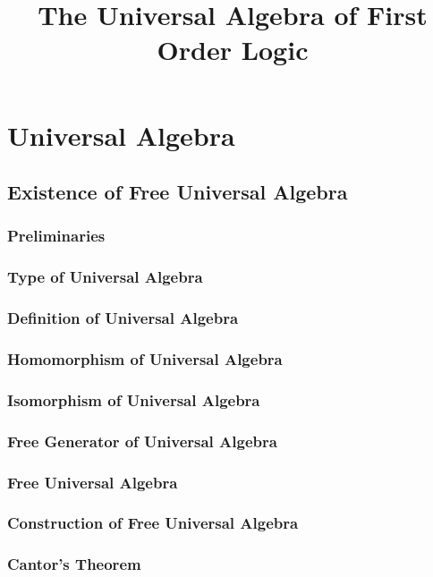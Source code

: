 \documentclass{report}
\title{The Universal Algebra of
  First Order Logic}
\begin{document}
\maketitle
\tableofcontents
\newpage
\chapter{Universal Algebra}
\section{Existence of Free Universal Algebra}
    \subsection{Preliminaries}
    \subsection{Type of Universal Algebra}
    \subsection{Definition of Universal Algebra}
    \subsection{Homomorphism of Universal Algebra}
    \subsection{Isomorphism of Universal Algebra}
    \subsection{Free Generator of Universal Algebra}
    \subsection{Free Universal Algebra}
    \subsection{Construction of Free Universal Algebra}
    \subsection{Cantor's Theorem} 
\end{document}
